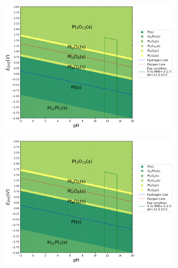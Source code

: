 \documentclass[journal=jacsat,manuscript=article]{achemso}
\begin{document}
\begin{figure}[htbp]
    \centering
    \begin{subfigure}[b]{0.3\textwidth}
        \subcaption{}\label{fig:Pt_Pourbaix_H2O}
        \includegraphics[width=\textwidth]{Figures/pourbaix_diagrams/Pt-NH3-H2O_activity=1e-04_[NH3]=0M_[Gly]=0M_[CN]=0.png}
        \par\medskip
    \end{subfigure}
    \begin{subfigure}[b]{0.3\textwidth}
        \subcaption{}\label{fig:Pt_Pourbaix_NH3_Gly}
        \includegraphics[width=\textwidth]{Figures/pourbaix_diagrams/Pt-NH3-H2O_activity=1e-04_[NH3]=0.02M_[Gly]=0.005M_[CN]=0.png}
        \par\medskip

\end{subfigure}
\end{figure}
\end{document}
